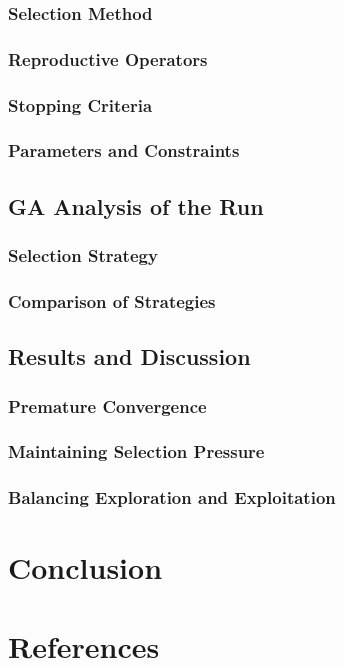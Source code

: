 \documentclass[conference]{inc/IEEEtran}
\begin{document}
\subsubsection{Selection Method}

\subsubsection{Reproductive Operators}

\subsubsection{Stopping Criteria}

\subsubsection{Parameters and Constraints}
\subsection{GA Analysis of the Run}

\subsubsection{Selection Strategy}

\subsubsection{Comparison of Strategies}
\subsection{Results and Discussion}

\subsubsection{Premature Convergence}

\subsubsection{Maintaining Selection Pressure}

\subsubsection{Balancing Exploration and Exploitation}

\section{Conclusion}

\section*{References}




\end{document}
